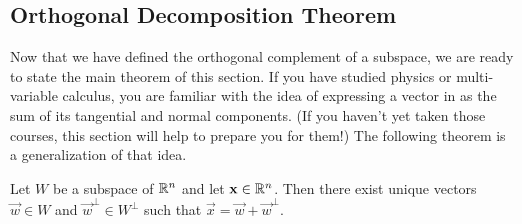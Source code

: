 \documentclass{ximera}
\begin{document}
\subsection*{Orthogonal Decomposition Theorem}

Now that we have defined the orthogonal complement of a subspace, we are ready to state the main theorem of this section.  If you have studied physics or multi-variable calculus, you are familiar with the idea of expressing a vector in as the sum of its tangential and normal components. (If you haven't yet taken those courses, this section will help to prepare you for them!)  The following theorem is a generalization of that idea.

\begin{theorem}\label{th:OrthoDecomp}
Let $W$ be a subspace of $\mathbb{R}^n$ and let $\mathbf{x} \in \mathbb{R}^n$.  Then there exist unique vectors $\vec{w} \in W$ and $\vec{w}^\perp \in W^\perp$ such that $\vec{x} = \vec{w} + \vec{w}^\perp$.
\end{theorem}
\end{document}
